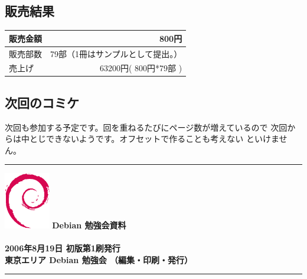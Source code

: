 \documentclass[mingoth,a4paper]{jsarticle}
\begin{document}
\subsection{販売結果}
\begin{tabular}{|l|r|}
 
\hline 販売金額 &

		800円\\

\hline 販売部数&
 
		79部（1冊はサンプルとして提出。）\\

\hline 売上げ&
 
		63200円( 800円*79部 )\\
\hline
\end{tabular}

\subsection{次回のコミケ}
次回も参加する予定です。回を重ねるたびにページ数が増えているので
次回からは中とじできないようです。オフセットで作ることも考えない
といけません。

\newpage

\vspace*{15cm}
\hrule
\vspace{2mm}
\includegraphics[width=2cm]{image200502/openlogo-nd.eps}
\noindent \Large \bf Debian 勉強会資料\\ \\
\noindent \normalfont 2006年8月19日 \hspace{5mm}  初版第1刷発行\\
\noindent \normalfont 東京エリア Debian 勉強会 （編集・印刷・発行）\\
\hrule
\end{document}
